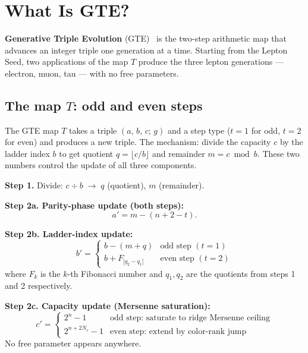 \documentclass[11pt,a4paper]{article}
\newcommand{\term}[1]{\textbf{#1}}
\newcommand{\Nc}{N_c}
\begin{document}
\section{What Is GTE?}
\label{sec:gte}

\begin{tcolorbox}[colback=boxorange,colframe=orange!60!black,title=Key idea]
\term{Generative Triple Evolution} (GTE)~\cite{SpivackGTECompleteFramework} is the two-step arithmetic map that
advances an integer triple one generation at a time.  Starting from the Lepton
Seed, two applications of the map $T$ produce the three lepton generations ---
electron, muon, tau --- with no free parameters.
\end{tcolorbox}

\subsection{The map $T$: odd and even steps}

The GTE map $T$ takes a triple $(a,\,b,\,c;\,g)$ and a step type
($t = 1$ for odd, $t = 2$ for even) and produces a new triple.  The
mechanism: divide the capacity $c$ by the ladder index $b$ to get
quotient $q = \lfloor c/b \rfloor$ and remainder $m = c \bmod b$.
These two numbers control the update of all three components.

\begin{tcolorbox}[colback=boxblue,colframe=blue!40!black,
  title={The GTE map $T$ (ridge $n$, color rank $N_c$)},breakable]
\textbf{Step 1.} Divide: $c \div b \;\to\; q$ (quotient), $m$ (remainder).

\medskip
\textbf{Step 2a. Parity-phase update (both steps):}
\[
  a' = m - (n + 2 - t).
\]

\textbf{Step 2b. Ladder-index update:}
\[
  b' = \begin{cases}
    b - (m + q) & \text{odd step } (t=1) \\[4pt]
    b + F_{|q_2 - q_1|} & \text{even step } (t=2)
  \end{cases}
\]
where $F_k$ is the $k$-th Fibonacci number and $q_1, q_2$ are the quotients from
steps 1 and 2 respectively.

\textbf{Step 2c. Capacity update (Mersenne saturation):}
\[
  c' = \begin{cases}
    2^n - 1 & \text{odd step: saturate to ridge Mersenne ceiling} \\[4pt]
    2^{n + 2\Nc} - 1 & \text{even step: extend by color-rank jump}
  \end{cases}
\]
No free parameter appears anywhere.
\end{tcolorbox}
\end{document}
